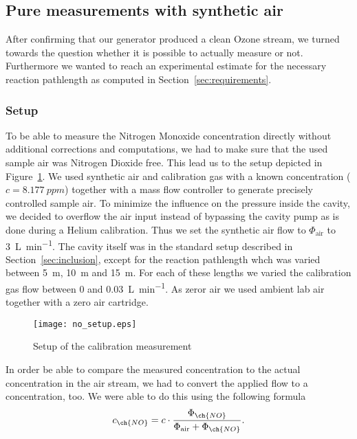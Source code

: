\subsection{Pure  measurements with synthetic air}
\label{sec:no}

After confirming that our generator produced a clean Ozone stream, we
turned towards the question whether it is possible to actually measure
 or not. Furthermore we wanted to reach an experimental
estimate for the necessary reaction pathlength as computed in
Section~\ref{sec:requirements}.

\subsubsection{Setup}
\label{sec:no-setup}

To be able to measure the Nitrogen Monoxide concentration directly
without additional corrections and computations, we had to make sure
that the used sample air was Nitrogen Dioxide free. This lead us to
the setup depicted in Figure~\ref{fig:no-setup}. We used synthetic air
and  calibration gas with a known  concentration ($c =
\SI{8.177}{ppm}$) together with a mass flow controller to generate
precisely controlled sample air. To minimize the influence on the
pressure inside the cavity, we decided to overflow the air input
instead of bypassing the cavity pump as is done during a Helium
calibration. Thus we set the synthetic air flow to $\Phi_{\text{air}}$
to \SI{3}{\liter\per\minute}. The cavity itself was in the standard
setup described in Section~\ref{sec:inclusion}, except for the
reaction pathlength whch was varied between \SI{5}{\meter},
\SI{10}{\meter} and \SI{15}{\meter}. For each of these lengths we
varied the  calibration gas flow between \num{0} and
\SI{0.03}{\liter\per\minute}. As zeror air we used ambient lab air
together with a zero air cartridge.

\begin{figure}[htbp]
  \centering
  \texttt{[image: no\_setup.eps]}
  \caption{Setup of the calibration measurement}
  \label{fig:no-setup}
\end{figure}

In order be able to compare the measured  concentration to the
actual concentration in the air stream, we had to convert the applied
 flow to a concentration, too. We were able to do this using the
following formula
\begin{align}
  c_{\ch{NO}} = c \cdot \frac{\Phi_{\ch{NO}}}{\Phi_{\text{air}} +
  \Phi_{\ch{NO}}}. \label{eq:c-flow}
\end{align}

